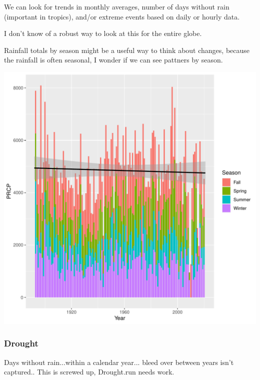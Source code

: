 \documentclass{article}\usepackage[]{graphicx}\usepackage[]{color}
\makeatletter
\def\maxwidth{ %
  \ifdim\Gin@nat@width>\linewidth
    \linewidth
  \else
    \Gin@nat@width
  \fi
}
\newenvironment{kframe}{%
 \def\at@end@of@kframe{}%
 \ifinner\ifhmode%
  \def\at@end@of@kframe{\end{minipage}}%
  \begin{minipage}{\columnwidth}%
 \fi\fi%
 \def\FrameCommand##1{\hskip\@totalleftmargin \hskip-\fboxsep
 \colorbox{shadecolor}{##1}\hskip-\fboxsep
     \hskip-\linewidth \hskip-\@totalleftmargin \hskip\columnwidth}%
 \MakeFramed {\advance\hsize-\width
   \@totalleftmargin\z@ \linewidth\hsize
   \@setminipage}}%
 {\par\unskip\endMakeFramed%
 \at@end@of@kframe}
\newenvironment{knitrout}{}{} %
\makeatother
\begin{document}
We can look for trends in monthly averages, number of days without rain (important in tropics), and/or extreme events based on daily or hourly data. 

I don't know of a robust way to look at this for the entire globe. 



Rainfall totals by season might be a useful way to think about changes, because the rainfall is often seasonal, I wonder if we can see pattners by season. 

\begin{knitrout}
\color{fgcolor}\begin{kframe}


{\ttfamily\noindent\itshape{}}\end{kframe}
\includegraphics[width=\maxwidth]{figure/unnamed-chunk-10-1} 
\end{knitrout}

\subsubsection{Drought}

Days without rain...within a calendar year... bleed over between years isn't captured.. This is screwed up, Drought.run needs work.
\end{document}
